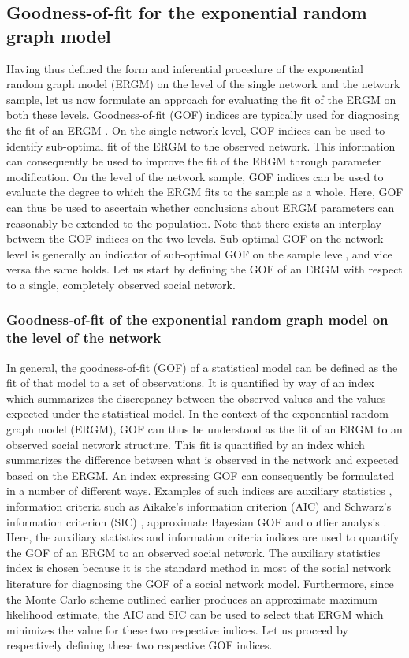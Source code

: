 \documentclass[a4paper, man, floatsintext]{apa6}
\begin{document}
\subsection{Goodness-of-fit for the exponential random graph model}
Having thus defined the form and inferential procedure of the exponential random graph model (ERGM) on the level of the single network and the network sample, let us now formulate an approach for evaluating the fit of the ERGM on both these levels. \clearpage \noindent Goodness-of-fit (GOF) indices are typically used for diagnosing the fit of an ERGM \cite{lusher2013exponential}. On the single network level, GOF indices can be used to identify sub-optimal fit of the ERGM to the observed network. This information can consequently be used to improve the fit of the ERGM through parameter modification. On the level of the network sample, GOF indices can be used to evaluate the degree to which the ERGM fits to the sample as a whole. Here, GOF can thus be used to ascertain whether conclusions about ERGM parameters can reasonably be extended to the population. Note that there exists an interplay between the GOF indices on the two levels. Sub-optimal GOF on the network level is generally an indicator of sub-optimal GOF on the sample level, and vice versa the same holds. Let us start by defining the GOF of an ERGM with respect to a single, completely observed social network. 
\\
\subsubsection{Goodness-of-fit of the exponential random graph model on the level of the network} In general, the goodness-of-fit (GOF) of a statistical model can be defined as the fit of that model to a set of observations. It is quantified by way of an index which summarizes the discrepancy between the observed values and the values expected under the statistical model. In the context of the exponential random graph model (ERGM), GOF can thus be understood as the fit of an ERGM to an observed social network structure. This fit is quantified by an index which summarizes the difference between what is observed in the network and expected based on the ERGM. An index expressing GOF can consequently be formulated in a number of different ways. Examples of such indices are auxiliary statistics \cite{hunter2008goodness}, information criteria such as Aikake's information criterion (AIC) \cite{akaike1974new} and Schwarz's information criterion (SIC) \cite{schwarz1978estimating}, approximate Bayesian GOF \cite{lusher2013exponential} and outlier analysis \cite{koskinen2018outliers}. Here, the auxiliary statistics and information criteria indices are used to quantify the GOF of an ERGM to an observed social network. The auxiliary statistics index is chosen because it is the standard method in most of the social network literature for diagnosing the GOF of a social network model. \clearpage \noindent Furthermore, since the Monte Carlo scheme outlined earlier produces an approximate maximum likelihood estimate, the AIC and SIC can be used to select that ERGM which minimizes the value for these two respective indices. Let us proceed by respectively defining these two respective GOF indices. 
\\
\end{document}
